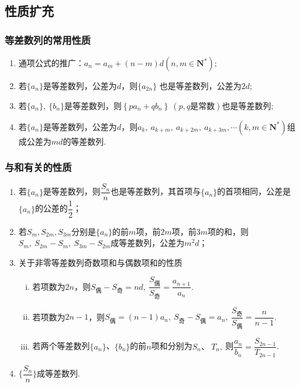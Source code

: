   \subsection{性质扩充}
    \subsubsection{等差数列的常用性质}
      \begin{enumerate}[(1)]
      \item 通项公式的推广：$ a_n=a_m+\left(n-m\right)d \left(n,m\in\mathbf{N^*}\right)$;
      \item 若$\{a_n\}$是等差数列，公差为$ d $，则$\{a_{2n}\}$ 也是等差数列，公差为$ 2d $;
      \item 若$\{a_n\},~\{b_n\}$是等差数列，则$ \left\{pa_n+qb_n\right\}~(p,q\text{是常数}) $也是等差数列;
      \item 若$\{a_n\}$是等差数列，公差为$ d $，则$ a_k,~a_{k+m},~ a_{k+2m},~a_{k+3m},\cdots\left(k,m\in\mathbf{N^*}\right)$组成公差为$ md $的等差数列.
      \end{enumerate}
    \subsubsection{与和有关的性质}
      \begin{enumerate}[(1)]
        \item 若$\{a_n\}$是等差数列，则$ \dfrac{S_n}{n} $也是等差数列，其首项与$ \{a_n\} $的首项相同，公差是$\{a_n\}$的公差的$ \dfrac{1}{2} $；
        \item 若$ S_m,S_{2m},S_{3m} $分别是$\{a_n\}$的前$ m $项，前$ 2m $项，前$ 3m $项的和，则$ S_m,~S_{2m}-S_m,~S_{3m}-S_{2m} $成等差数列，公差为$m^2d$；
        \item 关于非零等差数列奇数项和与偶数项和的性质
        \begin{enumerate}[i)]
          \item 若项数为$ 2n $，则$ S_{\text{偶}}-S_{\text{奇}}=nd ,~\dfrac{S_{\text{偶}}}{S_{\text{奇}}}=\dfrac{a_{n+1}}{a_n}$.
          \item 若项数为$ 2n-1 $，则$  S_{\text{偶}}=(n-1)a_n,~S_{\text{奇}}-S_{\text{偶}}=a_n,~\dfrac{S_{\text{奇}}}{S_{\text{偶}}}=\dfrac{n}{n-1}$.
          \item 若两个等差数列$\{a_n\}$、$\{b_n\}$的前$ n $项和分别为$ S_n\text{、}~T_n,~ $则$ \dfrac{a_n}{b_n}=\dfrac{S_{2n-1}}{T_{2n-1}} $.
        \end{enumerate}
        \item $\{\dfrac{S_n}{n}\}$成等差数列.
      \end{enumerate}
